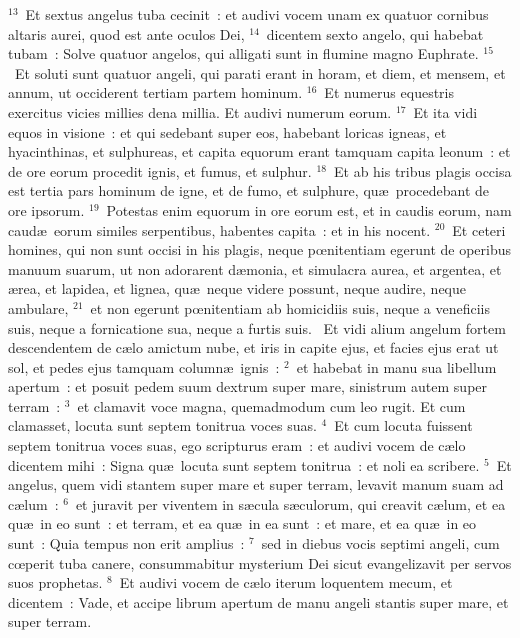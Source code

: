 ${}^{13}$~Et sextus angelus tuba cecinit~: et audivi vocem unam ex quatuor cornibus altaris aurei, quod est ante oculos Dei,
${}^{14}$~dicentem sexto angelo, qui habebat tubam~: Solve quatuor angelos, qui alligati sunt in flumine magno Euphrate.
${}^{15}$~Et soluti sunt quatuor angeli, qui parati erant in horam, et diem, et mensem, et annum, ut occiderent tertiam partem hominum.
${}^{16}$~Et numerus equestris exercitus vicies millies dena millia. Et audivi numerum eorum.
${}^{17}$~Et ita vidi equos in visione~: et qui sedebant super eos, habebant loricas igneas, et hyacinthinas, et sulphureas, et capita equorum erant tamquam capita leonum~: et de ore eorum procedit ignis, et fumus, et sulphur.
${}^{18}$~Et ab his tribus plagis occisa est tertia pars hominum de igne, et de fumo, et sulphure, qu\ae\ procedebant de ore ipsorum.
${}^{19}$~Potestas enim equorum in ore eorum est, et in caudis eorum, nam caud\ae\ eorum similes serpentibus, habentes capita~: et in his nocent.
${}^{20}$~Et ceteri homines, qui non sunt occisi in his plagis, neque pœnitentiam egerunt de operibus manuum suarum, ut non adorarent d\ae monia, et simulacra aurea, et argentea, et \ae rea, et lapidea, et lignea, qu\ae\ neque videre possunt, neque audire, neque ambulare,
${}^{21}$~et non egerunt pœnitentiam ab homicidiis suis, neque a veneficiis suis, neque a fornicatione sua, neque a furtis suis.
~\lettrine[lines=10,image=true,loversize=0.05,lraise=-0.03]{E}{}t vidi alium angelum fortem descendentem de c\ae lo amictum nube, et iris in capite ejus, et facies ejus erat ut sol, et pedes ejus tamquam column\ae\ ignis~:
${}^{2}$~et habebat in manu sua libellum apertum~: et posuit pedem suum dextrum super mare, sinistrum autem super terram~:
${}^{3}$~et clamavit voce magna, quemadmodum cum leo rugit. Et cum clamasset, locuta sunt septem tonitrua voces suas.
${}^{4}$~Et cum locuta fuissent septem tonitrua voces suas, ego scripturus eram~: et audivi vocem de c\ae lo dicentem mihi~: Signa qu\ae\ locuta sunt septem tonitrua~: et noli ea scribere.
${}^{5}$~Et angelus, quem vidi stantem super mare et super terram, levavit manum suam ad c\ae lum~:
${}^{6}$~et juravit per viventem in s\ae cula s\ae culorum, qui creavit c\ae lum, et ea qu\ae\ in eo sunt~: et terram, et ea qu\ae\ in ea sunt~: et mare, et ea qu\ae\ in eo sunt~: Quia tempus non erit amplius~:
${}^{7}$~sed in diebus vocis septimi angeli, cum cœperit tuba canere, consummabitur mysterium Dei sicut evangelizavit per servos suos prophetas.
${}^{8}$~Et audivi vocem de c\ae lo iterum loquentem mecum, et dicentem~: Vade, et accipe librum apertum de manu angeli stantis super mare, et super terram.
